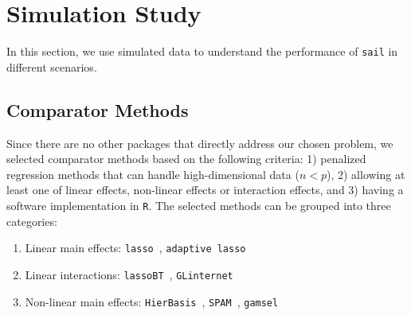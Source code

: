 \documentclass[useAMS,usenatbib,referee]{biom}
\begin{document}

\section{Simulation Study} \label{sec:sail_simulation}
In this section, we use simulated data to understand the performance of  \texttt{sail} in different scenarios.

\subsection{Comparator Methods}

Since there are no other packages that directly address our chosen problem, we selected comparator methods based on the following criteria: 1) penalized regression methods that can handle high-dimensional data ($n<p$), 2) allowing at least one of linear effects, non-linear effects or interaction effects, and 3) having a software implementation in \texttt{R}. The selected methods can be grouped into three categories:
\begin{enumerate}
	\item Linear main effects: \texttt{lasso}~\citep{tibshirani1996regression}, \texttt{adaptive lasso}~\citep{zou2006adaptive}
	\item Linear interactions: \texttt{lassoBT}~\citep{shah2016modelling}, \texttt{GLinternet}~\citep{lim2015learning}
	\item Non-linear main effects: \texttt{HierBasis}~\citep{haris2016nonparametric}, \texttt{SPAM}~\citep{ravikumar2009sparse}, \texttt{gamsel}~\citep{chouldechova2015generalized}
\end{enumerate}
\end{document}
